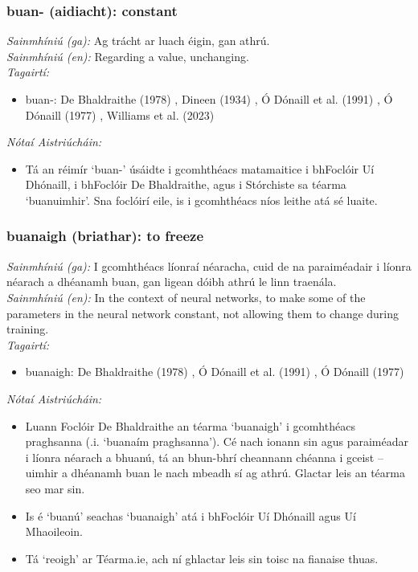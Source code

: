 \documentclass{article}
\begin{document}
\subsubsection*{buan- (aidiacht): constant}
 \noindent \textit{Sainmhíniú (ga):} Ag trácht ar luach éigin, gan athrú.
\\
 \noindent \textit{Sainmhíniú (en):} Regarding a value, unchanging.
\\
 \noindent \textit{Tagairtí:}
\begin{itemize}
	\item buan-: De Bhaldraithe (1978) \cite{de-bhaldraithe}, Dineen (1934) \cite{dineen}, Ó Dónaill et al. (1991) \cite{focloir-beag}, Ó Dónaill (1977) \cite{odonaill}, Williams et al. (2023) \cite{storchiste}
\end{itemize}

 \noindent \textit{Nótaí Aistriúcháin:}
\begin{itemize}
	\item Tá an réimír `buan-' úsáidte i gcomhthéacs matamaitice i bhFoclóir Uí Dhónaill, i bhFoclóir De Bhaldraithe, agus i Stórchiste sa téarma `buanuimhir'. Sna foclóirí eile, is i gcomhthéacs níos leithe atá sé luaite.
\end{itemize}


\subsubsection*{buanaigh (briathar): to freeze}
 \noindent \textit{Sainmhíniú (ga):} I gcomhthéacs líonraí néaracha, cuid de na paraiméadair i líonra néarach a dhéanamh buan, gan ligean dóibh athrú le linn traenála.
\\
 \noindent \textit{Sainmhíniú (en):} In the context of neural networks, to make some of the parameters in the neural network constant, not allowing them to change during training.
\\
 \noindent \textit{Tagairtí:}
\begin{itemize}
	\item buanaigh: De Bhaldraithe (1978) \cite{de-bhaldraithe}, Ó Dónaill et al. (1991) \cite{focloir-beag}, Ó Dónaill (1977) \cite{odonaill}
\end{itemize}

 \noindent \textit{Nótaí Aistriúcháin:}
\begin{itemize}
	\item Luann Foclóir De Bhaldraithe an téarma `buanaigh' i gcomhthéacs praghsanna (.i. `buanaím praghsanna'). Cé nach ionann sin agus paraiméadar i líonra néarach a bhuanú, tá an bhun-bhrí cheannann chéanna i gceist -- uimhir a dhéanamh buan le nach mbeadh sí ag athrú. Glactar leis an téarma seo mar sin.
	\item Is é `buanú' seachas `buanaigh' atá i bhFoclóir Uí Dhónaill agus Uí Mhaoileoin.
	\item Tá `reoigh' ar Téarma.ie, ach ní ghlactar leis sin toisc na fianaise thuas.
\end{itemize}
\end{document}

